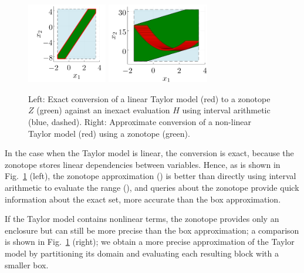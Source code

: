 \begin{figure}
	\centering
	\includegraphics[height=3.5cm, keepaspectratio]{img/taylormodel_linear}
	\includegraphics[height=3.5cm, keepaspectratio]{img/taylormodel_nonlinear}
	\caption{Left: Exact conversion of a linear Taylor model (red) to a zonotope $Z$ (green) against an inexact evaluation $H$ using interval arithmetic (blue, dashed). Right: Approximate conversion of a non-linear Taylor model (red) using a zonotope (green).}
	\label{fig:taylormodelsconversion}
\end{figure}

In the case when the Taylor model is linear, the conversion is exact, because the zonotope stores linear dependencies between variables.
%
Hence, as is shown in Fig.~\ref{fig:taylormodelsconversion} (left), the zonotope approximation () is better than directly using interval arithmetic to evaluate the range (), and queries about the zonotope provide quick information about the exact set, more accurate than the box approximation.

%  
% 

\smallskip

If the Taylor model contains nonlinear terms, the zonotope provides only an enclosure but can still be more precise than the box approximation; a comparison is shown in Fig.~\ref{fig:taylormodelsconversion} (right); we obtain a more precise approximation of the Taylor model by partitioning its domain and evaluating each resulting block with a smaller box.

